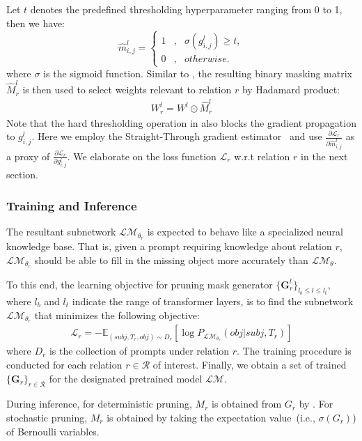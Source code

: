 Let $t$ denotes the predefined thresholding hyperparameter ranging from 0 to 1, then we have:
\begin{equation}
\label{eq:hard}
\hat{m}_{i,j}^l=\left\{
\begin{aligned}
1 & , & \sigma(g_{i,j}^l)\ge t, \\
0 & , & otherwise.
\end{aligned}
\right.
\end{equation}
where $\sigma$ is the sigmoid function. Similar to , the resulting binary masking matrix $\hat{M}_r^l$ is then used to select weights relevant to relation $r$ by Hadamard product:
\begin{align}
	\label{eq:deterministic}
	W_r^l = W^l \odot \hat{M}_r^l
\end{align}
Note that the hard thresholding operation in  also blocks the gradient propagation to $g_{i,j}^l$. Here we employ the Straight-Through gradient estimator~\citep{DBLP:journals/corr/BengioLC13,NIPS2016_d8330f85,zhao2020} and use $\frac{\partial \mathcal{L}_r}{\partial \hat{m}_{i,j}^l}$ as a proxy of $\frac{\partial \mathcal{L}_r}{\partial g_{i,j}^l}$.  We elaborate on the loss function $\mathcal{L}_r$ w.r.t relation $r$ in the next section.


\subsubsection{Training and Inference}
\label{sec:training}
The resultant subnetwork $\mathcal{LM}_{\theta_r}$ is expected to behave like a specialized neural knowledge base. That is, given a prompt requiring knowledge about relation $r$, $\mathcal{LM}_{\theta_r}$ should be able to fill in the missing object more accurately than $\mathcal{LM}_{\theta}$.

To this end, the learning objective for pruning mask generator 
$\{\bm{G}_r^l\}_{l_b \leq l \leq l_t}$, where $l_b$ and $l_t$ indicate 
the range of transformer layers, is to find the subnetwork 
$\mathcal{LM}_{\theta_r}$ that minimizes the following objective:
\begin{align}\nonumber
	\mathcal{L}_r=-\mathbb{E}_{(subj, T_r, obj)\sim D_r}[\log{P_{\mathcal{LM}_{\theta_r}}(obj|subj, T_r)}]
	\label{eq:objective}
\end{align}
where $D_r$ is the collection of prompts under relation $r$. The training procedure is conducted for each relation $r\in \mathcal{R}$ of interest. Finally, we obtain a set of trained $\{\bm{G}_r\}_{r\in \mathcal{R}}$ for the designated pretrained model $\mathcal{LM}$.

During inference, for deterministic pruning, $M_r$ is obtained from $G_r$ by . For stochastic pruning, $M_r$ is obtained by taking the expectation value~(i.e., $\sigma(G_r)$) of Bernoulli variables.

